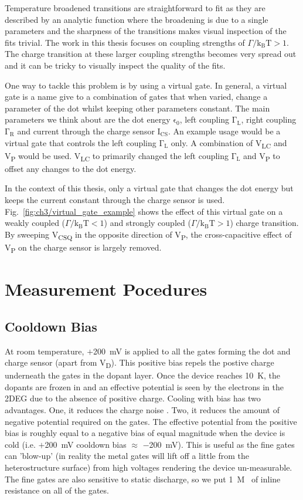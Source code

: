 Temperature broadened transitions are straightforward to fit as they are described by an analytic function where the broadening is due to a single parameters and the sharpness of the transitions makes visual inspection of the fits trivial. The work in this thesis focuses on coupling strengths of $\Gamma/\mathrm{k_BT}>1$. The charge transition at these larger coupling strengths becomes very spread out and it can be tricky to visually inspect the quality of the fits. 

One way to tackle this problem is by using a virtual gate. In general, a virtual gate is a name give to a combination of gates that when varied, change a parameter of the dot whilst keeping other parameters constant. The main parameters we think about are the dot energy $\mathrm{\epsilon_0}$, left coupling $\mathrm{\Gamma_L}$, right coupling $\mathrm{\Gamma_R}$ and current through the charge sensor $\mathrm{I_{CS}}$. An example usage would be a virtual gate that controls the left coupling $\mathrm{\Gamma_L}$ only. A combination of V\textsubscript{LC} and V\textsubscript{P} would be used. V\textsubscript{LC} to primarily changed the left coupling $\mathrm{\Gamma_L}$ and V\textsubscript{P} to offset any changes to the dot energy. 

In the context of this thesis, only a virtual gate that changes the dot energy but keeps the current constant through the charge sensor is used. Fig.~\ref{fig:ch3/virtual_gate_example} shows the effect of this virtual gate on a weakly coupled ($\Gamma/\mathrm{k_BT}<1$) and strongly coupled ($\Gamma/\mathrm{k_BT}>1$) charge transition. By sweeping V\textsubscript{CSQ} in the opposite direction of V\textsubscript{P}, the cross-capacitive effect of V\textsubscript{P} on the charge sensor is largely removed. 


\afterpage{\clearpage}
\section{Measurement Pocedures}

\subsection{Cooldown Bias}
At room temperature, $+$\qty{200}{mV} is applied to all the gates forming the dot and charge sensor (apart from V\textsubscript{D}). This positive bias repels the postive charge underneath the gates in the dopant layer. Once the device reaches \qty{10}{K}, the dopants are frozen in and an effective potential is seen by the electrons in the 2DEG due to the absence of positive charge. Cooling with bias has two advantages. One, it reduces the charge noise \cite{bias_cooling}. Two, it reduces the amount of negative potential required on the gates. The effective potential from the positive bias is roughly equal to a negative bias of equal magnitude when the device is cold (i.e. $+$\qty{200}{mV} cooldown bias $\approx$ $-$\qty{200}{mV}). This is useful as the fine gates can 'blow-up' (in reality the metal gates will lift off a little from the heterostructure surface) from high voltages rendering the device un-measurable. The fine gates are also sensitive to static discharge, so we put \qty{1}{M\Omega} of inline resistance on all of the gates.   

